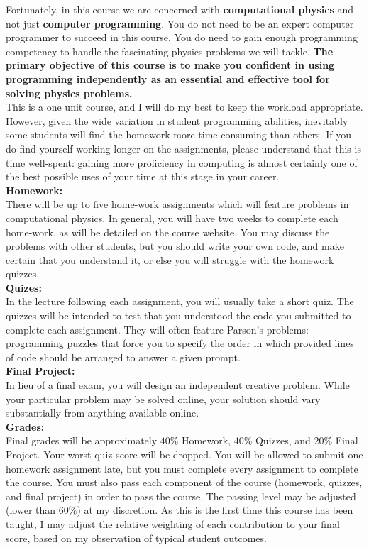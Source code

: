 \documentclass[12pt]{article}
\begin{document}
Fortunately, in this course we are concerned with {\bf computational physics} and not just {\bf computer programming}.  You do not need to be an expert computer programmer to succeed in this course. You do need to gain enough programming competency to handle the fascinating physics problems we will tackle.  {\bf The primary objective of this course is to make you confident in using programming independently as an essential and effective tool for solving physics problems.}\\[3pt]

\noindent
This is a one unit course, and I will do my best to keep the workload appropriate.  However, given the wide variation in student programming abilities, inevitably some students will find the homework more time-consuming than others.  If you do find yourself working longer on the assignments, please understand that this is time well-spent:  gaining more proficiency in computing is almost certainly one of the best possible uses of your time at this stage in your career.\\[3pt]

\noindent
\textbf{Homework:}\\
There will be up to five home-work assignments which will feature problems in computational physics.
In general, you will have two weeks to complete each home-work, as will be detailed on the course website.  You may discuss the problems with other students, but you should write your own code, and make certain that you understand it, or else you will struggle with the homework quizzes.\\[3pt]

\noindent
\textbf{Quizes:}\\
In the lecture following each assignment, you will usually take a short quiz.  The quizzes will be intended to test that you understood the code you submitted to complete each assignment.  They will often feature Parson's problems:  programming puzzles that force you to specify the order in which provided lines of code should be arranged to answer a given prompt.\\[3pt]

\noindent
\noindent
\textbf{Final Project:}\\
In lieu of a final exam, you will design an independent creative problem.  While your particular problem may be solved online, your solution should vary substantially from anything available online.\\[3pt]

\noindent
\textbf {Grades:}\\
Final grades will be approximately $40\%$ Homework, $40\%$ Quizzes, and
$20\%$ Final Project.  Your worst quiz score will be dropped.  You will be allowed to submit one homework assignment late, but you must complete every assignment to complete the course.
You must also pass each component of the course (homework, quizzes, and final project) in order to pass the course.  The passing level may be adjusted (lower than $60\%$) at my discretion. As this is the first time this course has been taught, I may adjust the relative weighting of each contribution to your final score, based on my observation of typical student outcomes.\\
\noindent
\end{document}
